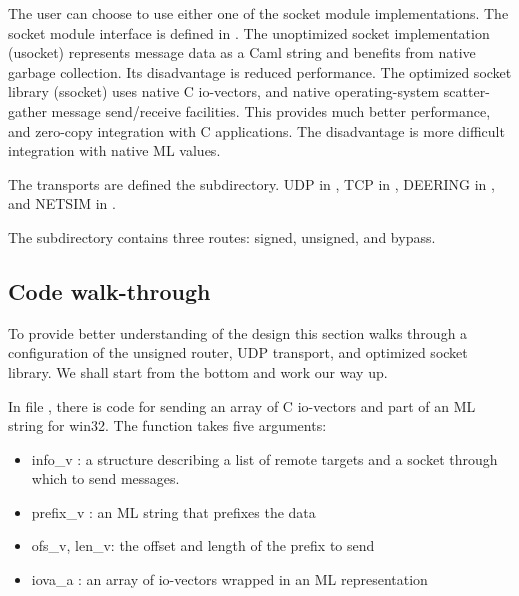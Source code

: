 The user can choose to use either one of the socket module
implementations. The socket module interface is defined in
. The unoptimized socket implementation
(usocket) represents message data as a Caml string and benefits from
native garbage collection. Its disadvantage is reduced
performance. The optimized socket library (ssocket) uses native C
io-vectors, and native operating-system scatter-gather message
send/receive facilities. This provides much better performance, and
zero-copy integration with C applications. The disadvantage is more
difficult integration with native ML values. 

The transports are defined the  subdirectory. 
UDP in , TCP in ,
DEERING in , and NETSIM in
.

The  subdirectory contains three routes: signed,
unsigned, and bypass.

\subsection{Code walk-through}
To provide better understanding of the design this section walks
through a configuration of the unsigned router, UDP transport, 
and optimized socket library. We shall start from the bottom
and work our way up. 

In file , there is code for sending an
array of C io-vectors and part of an ML string for win32. The function takes
five arguments:
\begin{itemize}
\item info\_v : a structure describing a list of remote targets and a
socket through which to send messages.
\item prefix\_v : an ML string that prefixes the data
\item ofs\_v, len\_v: the offset and length of the prefix to send
\item iova\_a : an array of io-vectors wrapped in an ML representation
\end{itemize}

